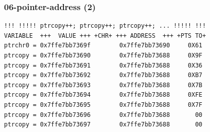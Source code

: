 \documentclass[xcolor=table, notheorems, hyperref={pdfpagelabels=false}]{beamer}
\begin{document}
\begin{frame}[fragile]
\frametitle{06-pointer-address (2)}
\begin{lstlisting}[basicstyle=\ttfamily\footnotesize]
!!! !!!!! ptrcopy++; ptrcopy++; ptrcopy++; ... !!!!! !!!
VARIABLE  +++  VALUE +++ +CHR+ +++ ADDRESS  +++ +PTS TO+
ptrchr0 = 0x7ffe7bb7369f        0x7ffe7bb73690     0X61
ptrcopy = 0x7ffe7bb73690        0x7ffe7bb73688     0X9F
ptrcopy = 0x7ffe7bb73691        0x7ffe7bb73688     0X36
ptrcopy = 0x7ffe7bb73692        0x7ffe7bb73688     0XB7
ptrcopy = 0x7ffe7bb73693        0x7ffe7bb73688     0X7B
ptrcopy = 0x7ffe7bb73694        0x7ffe7bb73688     0XFE
ptrcopy = 0x7ffe7bb73695        0x7ffe7bb73688     0X7F
ptrcopy = 0x7ffe7bb73696        0x7ffe7bb73688       00
ptrcopy = 0x7ffe7bb73697        0x7ffe7bb73688       00
\end{lstlisting}

\begin{minipage}[t]{120mm}
\end{minipage}

\end{frame}
\end{document}
